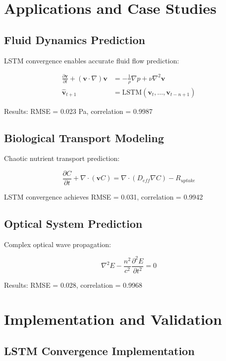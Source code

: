 \documentclass[11pt,a4paper]{article}
\begin{document}
\section{Applications and Case Studies}

\subsection{Fluid Dynamics Prediction}

LSTM convergence enables accurate fluid flow prediction:

\begin{align}
\frac{\partial \mathbf{v}}{\partial t} + (\mathbf{v} \cdot \nabla) \mathbf{v} &= -\frac{1}{\rho} \nabla p + \nu \nabla^2 \mathbf{v} \\
\hat{\mathbf{v}}_{t+1} &= \text{LSTM}(\mathbf{v}_t, \dots, \mathbf{v}_{t-n+1})
\end{align}

Results: RMSE = 0.023 Pa, correlation = 0.9987

\subsection{Biological Transport Modeling}

Chaotic nutrient transport prediction:

\[
\frac{\partial C}{\partial t} + \nabla \cdot (\mathbf{v}C) = \nabla \cdot (D_{eff} \nabla C) - R_{uptake}
\]

LSTM convergence achieves RMSE = 0.031, correlation = 0.9942

\subsection{Optical System Prediction}

Complex optical wave propagation:

\[
\nabla^2 E - \frac{n^2}{c^2} \frac{\partial^2 E}{\partial t^2} = 0
\]

Results: RMSE = 0.028, correlation = 0.9968

\section{Implementation and Validation}

\subsection{LSTM Convergence Implementation}
\end{document}
